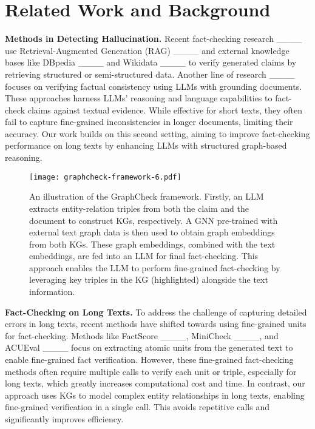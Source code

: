 \section{Related Work and Background}
\textbf{Methods in Detecting Hallucination.} 
Recent fact-checking research ____ use Retrieval-Augmented Generation (RAG) ____ and external knowledge bases like DBpedia ____ and Wikidata ____ to verify generated claims by retrieving structured or semi-structured data.
Another line of research ____ focuses on verifying factual consistency using LLMs with grounding documents. These approaches harness LLMs’ reasoning and language capabilities to fact-check claims against textual evidence. While effective for short texts, they often fail to capture fine-grained inconsistencies in longer documents, limiting their accuracy.
Our work builds on this second setting, aiming to improve fact-checking performance on long texts by enhancing LLMs with structured graph-based reasoning.

\begin{figure*}[t!]
    \centering
    \texttt{[image: graphcheck-framework-6.pdf]}
    \caption{An illustration of the GraphCheck framework. Firstly, an LLM extracts entity-relation triples from both the claim and the document to construct KGs, respectively. 
    A GNN pre-trained with external text graph data is then used to obtain graph embeddings from both KGs. 
    These graph embeddings, combined with the text embeddings, are fed into an LLM for final fact-checking. 
    This approach enables the LLM to perform fine-grained fact-checking by leveraging key triples in the KG (highlighted) alongside the text information.}
    \label{fig:pipline}
\end{figure*}

\noindent\textbf{Fact-Checking on Long Texts.}
To address the challenge of capturing detailed errors in long texts, recent methods have shifted towards using fine-grained units for fact-checking. 
Methods like FactScore ____, MiniCheck ____, and ACUEval ____ focus on extracting atomic units from the generated text to enable fine-grained fact verification. 
However, these fine-grained fact-checking methods often require multiple calls to verify each unit or triple, especially for long texts, which greatly increases computational cost and time.
In contrast, our approach uses KGs to model complex entity relationships in long texts, enabling fine-grained verification in a single call. This avoids repetitive calls and significantly improves efficiency.

